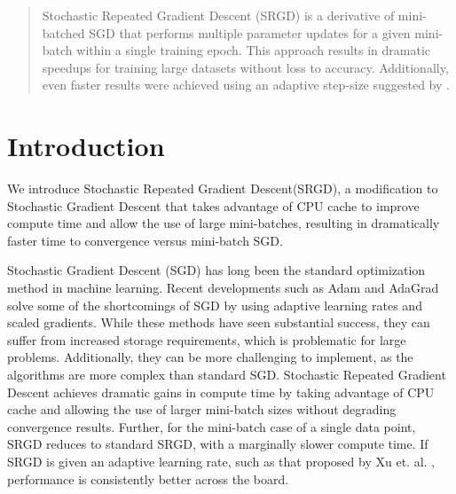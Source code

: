 \documentclass[conference,compsoc]{IEEEtran}
\begin{document}
\maketitle

\begin{abstract}
    Stochastic Repeated Gradient Descent (SRGD) is a derivative of mini-batched
    SGD that performs multiple parameter updates for a given mini-batch within a
    single training epoch. This approach results in dramatic speedups for
    training large datasets without loss to accuracy. Additionally, even faster
    results were achieved using an adaptive step-size suggested by \cite{bib:xu-assgd}.
\end{abstract}





%
\IEEEpeerreviewmaketitle



\section{Introduction}
We introduce Stochastic Repeated Gradient Descent(SRGD), a modification to
Stochastic Gradient Descent that takes advantage of CPU cache to improve compute
time and allow the use of large mini-batches, resulting in dramatically faster
time to convergence versus mini-batch SGD. 

Stochastic Gradient Descent (SGD) has long been the standard optimization method
in machine learning. Recent developments such as Adam and AdaGrad solve some of
the shortcomings of SGD by using adaptive learning rates and scaled gradients.
While these methods have seen substantial success, they can suffer from increased
storage requirements, which is problematic for large problems. Additionally,
they can be more challenging to implement, as the algorithms are more complex
than standard SGD. Stochastic Repeated Gradient Descent achieves dramatic gains
in compute time by taking advantage of CPU cache and allowing the use of larger
mini-batch sizes without degrading convergence results. Further, for the
mini-batch case of a single data point, SRGD reduces to standard SRGD, with a
marginally slower compute time. If SRGD is given an adaptive learning rate, such
as that proposed by Xu et. al. \cite{bib:xu-assgd}, performance is consistently better
across the board.
\end{document}
